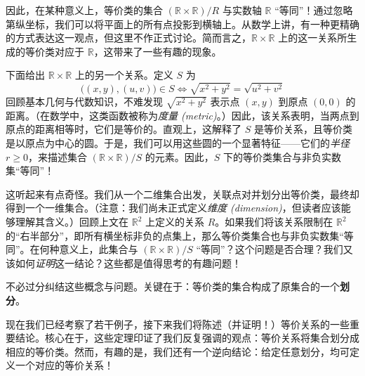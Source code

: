 因此，在某种意义上，等价类的集合 $(\mathbb{R} \times \mathbb{R})/R$ 与实数轴 $\mathbb{R}$ ``等同''！通过忽略第纵坐标，我们可以将平面上的所有点投影到横轴上。从数学上讲，有一种更精确的方式表达这一观点，但这里不作正式讨论。简而言之，$\mathbb{R} \times \mathbb{R}$ 上的这一关系所生成的等价类对应于 $\mathbb{R}$，这带来了一些有趣的现象。

下面给出 $\mathbb{R} \times \mathbb{R}$ 上的另一个关系。定义 $S$ 为
\[\big((x, y),(u, v)\big) \in S \iff \sqrt{x^2+y^2} = \sqrt{u^2+v^2}\]
回顾基本几何与代数知识，不难发现 $\sqrt{x^2 + y^2}$ 表示点 $(x, y)$ 到原点 $(0, 0)$ 的距离。（在数学中，这类函数被称为\emph{度量 (metric)}。）因此，该关系表明，当两点到原点的距离相等时，它们是等价的。直观上，这解释了 $S$ 是等价关系，且等价类是以原点为中心的圆。于是，我们可以用这些圆的一个显著特征——它们的\emph{半径} $r \ge 0$，来描述集合 $(\mathbb{R} \times \mathbb{R})/S$ 的元素。因此，$S$ 下的等价类集合与非负实数集``等同''！

\begin{center}
    {}
\end{center}

这听起来有点奇怪。我们从一个二维集合出发，关联点对并划分出等价类，最终却得到一个一维集合。（注意：我们尚未正式定义\emph{维度 (dimension)}，但读者应该能够理解其含义。）回顾上文在 $\mathbb{R}^2$ 上定义的关系 $R$。如果我们将该关系限制在 $\mathbb{R}^2$ 的``右半部分''，即所有横坐标非负的点集上，那么等价类集合也与非负实数集``等同''。在何种意义上，此集合与 $(\mathbb{R} \times \mathbb{R})/S$ ``等同''？这个问题是否合理？我们又该如何\emph{证明}这一结论？这些都是值得思考的有趣问题！

不必过分纠结这些概念与问题。关键在于：等价类的集合构成了原集合的一个\textbf{划分}。

现在我们已经考察了若干例子，接下来我们将陈述（并证明！）等价关系的一些重要结论。核心在于，这些定理印证了我们反复强调的观点：等价关系将集合划分成相应的等价类。然而，有趣的是，我们还有一个逆向结论：给定任意划分，均可定义一个对应的等价关系！

